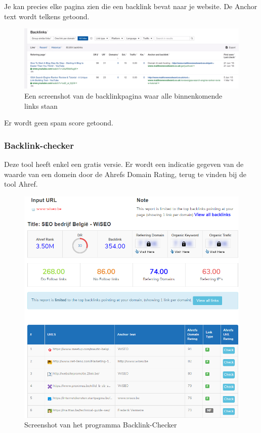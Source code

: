 Je kan precies elke pagina zien die een backlink bevat naar je website. De Anchor text wordt telkens getoond.

\begin{figure}[h!]
\centering
\includegraphics[width=\linewidth]{img/ahrefsbacklink.PNG}
\caption{Een screenshot van de backlinkpagina waar alle binnenkomende links staan
\autocite{ahrefs}}
\end{figure}

Er wordt geen spam score getoond. 

\subsubsection{Backlink-checker}
\label{ch: Backlink-checker}

Deze tool heeft enkel een gratis versie. Er wordt een indicatie gegeven van de waarde van een domein door de Ahrefs Domain Rating, terug te vinden bij de tool Ahref.

\begin{figure}[h!]
\centering
\includegraphics[width=\linewidth]{img/backlinkchecker.PNG}
\caption{Screenshot van het programma Backlink-Checker
\autocite{backlinkchecker}}
\end{figure}

